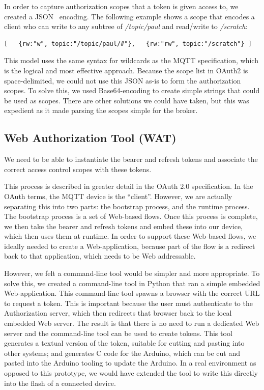 \documentclass{llncs}
\begin{document}
In order to capture authorization scopes that a token is given access to, we created a JSON~\cite{json} encoding. The following example shows a scope that encodes a client who can 
write to any subtree of \emph{/topic/paul} and read/write to \emph{/scratch}:
\begin{verbatim}
[   {rw:"w", topic:"/topic/paul/#"},   {rw:"rw", topic:"/scratch"} ]
\end{verbatim}
This model uses the same syntax for wildcards as the MQTT specification, which is the logical 
and most effective approach. Because the scope list in OAuth2 is space-delimited, we could not use this JSON as-is to form the authorization scopes. To solve this, we used Base64-encoding to create simple strings that could be used as scopes. There are other solutions we could have taken, but this was expedient as it made parsing the scopes simple for the broker.

\subsection{Web Authorization Tool (WAT)}
We need to be able 
to instantiate the bearer and refresh tokens and associate the correct access control scopes with these tokens. 

This process is described in greater detail in the OAuth 2.0 
specification. In the OAuth terms, the MQTT device is the ``client''. However, we are actually
separating this into two parts: the bootstrap process, and the runtime process. The bootstrap process is a set of Web-based flows. Once this
process is complete, we then take the bearer and refresh tokens and embed these into our device, which then uses them at runtime.
In order to support these Web-based flows, we ideally needed to create a Web-application, because
part of the flow is a redirect back to that application, which needs to be Web addressable. 

However, we felt a command-line tool would be simpler and more appropriate.
To solve this, we created a command-line tool in Python that ran a simple embedded Web-application. 
This command-line tool spawns a browser with the correct URL to request a token. This is important because the user must authenticate to the Authorization server, which
then redirects that browser back to the local embedded Web server. The result is that there is no 
need to run a dedicated Web server and the command-line tool can be used to create tokens.
This tool generates a textual version of the token, suitable for cutting and pasting into other systems;
and  generates C code for the Arduino, which can be cut and pasted into the Arduino tooling to update the Arduino.
In a real environment as opposed to this prototype, we would have extended the tool to write this directly into the flash of a connected device.
\end{document}
